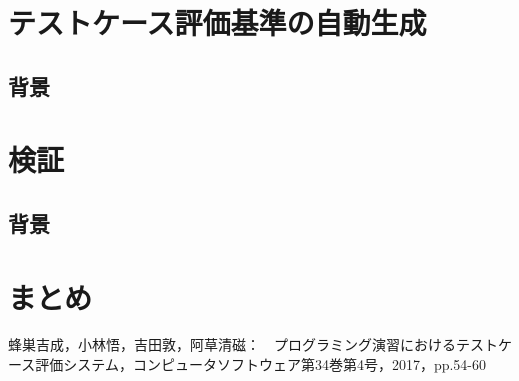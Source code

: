 \documentclass{tpu-sotu}
\begin{document}
\chapter{テストケース評価基準の自動生成}
\section{背景}
\chapter{検証}
\section{背景}
\chapter{まとめ}
\acknowledgements
\begin{thebibliography}{1}
    蜂巣吉成，小林悟，吉田敦，阿草清磁：　プログラミング演習におけるテストケース評価システム，コンピュータソフトウェア第34巻第4号，2017，pp.54-60
\end{thebibliography}
\end{document}
